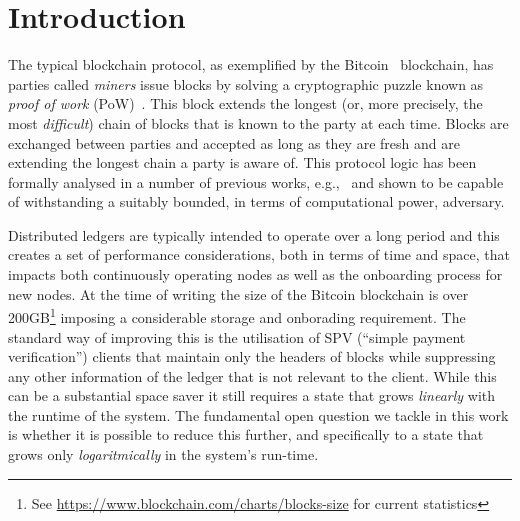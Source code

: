 \section{Introduction}


The typical blockchain protocol, as exemplified by the Bitcoin~\cite{bitcoin}
blockchain, has parties called \emph{miners} issue blocks by solving a cryptographic
puzzle known as \emph{proof of work} (PoW)~\cite{pow}. This block extends
the longest (or, more precisely, the most \emph{difficult}) chain of blocks that
is known to the party at each time. Blocks are exchanged between parties and
accepted as long as they are fresh and are extending the longest chain a party
is aware of. This protocol logic has been formally analysed in a number of
previous works,
e.g.,~\cite{backbone,varbackbone,pass-asynchronous,composable-bitcoin}
and shown to be capable of withstanding a suitably bounded, in terms of
computational power, adversary.


Distributed ledgers are typically intended to operate over a long period
and this creates a set of performance considerations,
both in terms of time and space, that impacts both
continuously operating nodes as well as the onboarding process for new nodes.
At the time of writing the size of the Bitcoin blockchain is
over 200GB\footnote{See \url{https://www.blockchain.com/charts/blocks-size} for
current statistics} imposing a considerable storage and onborading requirement.
The standard way of improving this is the utilisation of SPV (``simple payment
verification'') clients that maintain only the headers of blocks
while suppressing any other information of the ledger that is not relevant to
the client. While this can be a substantial space saver it still requires a
state that grows {\em linearly} with the runtime of the system. The fundamental
open question we tackle in this work is whether it is possible to reduce this
further, and specifically to a state that grows only {\em logaritmically} in the
system's run-time.

